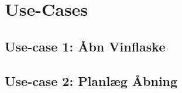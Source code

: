 
\section{Use-Cases}

\subsection{Use-case 1: Åbn Vinflaske}
\label{UC1}

\pagebreak

\subsection{Use-case 2: Planlæg Åbning}
\label{UC2}
\pagebreak


\pagebreak